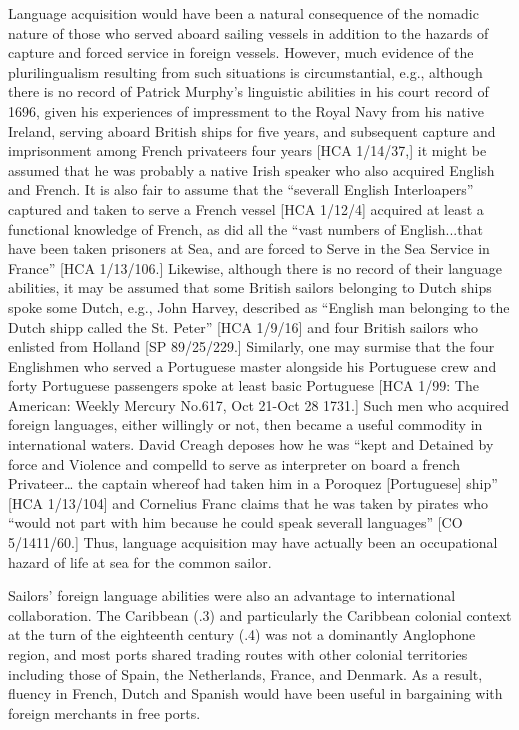 Language acquisition would have been a natural consequence of the nomadic nature of those who served aboard sailing vessels in addition to the hazards of capture and forced service in foreign vessels. However, much evidence of the plurilingualism resulting from such situations is circumstantial, e.g., although there is no record of Patrick Murphy’s linguistic abilities in his court record of 1696, given his experiences of impressment to the Royal Navy from his native Ireland, serving aboard British ships for five years, and subsequent capture and imprisonment among French privateers four years [HCA 1/14/37,] it might be assumed that he was probably a native Irish speaker who also acquired English and French. It is also fair to assume that the “severall English Interloapers” captured and taken to serve a French vessel [HCA 1/12/4] acquired at least a functional knowledge of French, as did all the “vast numbers of English...that have been taken prisoners at Sea, and are forced to Serve in the Sea Service in France” [HCA 1/13/106.]  Likewise, although there is no record of their language abilities, it may be assumed that some British sailors belonging to Dutch ships spoke some Dutch, e.g., John Harvey, described as “English man belonging to the Dutch shipp called the St. Peter” [HCA 1/9/16] and four British sailors who enlisted from Holland [SP 89/25/229.] Similarly, one may surmise that the four Englishmen who served a Portuguese master alongside his Portuguese crew and forty Portuguese passengers spoke at least basic Portuguese [HCA 1/99: The American: Weekly Mercury No.617, Oct 21-Oct 28 1731.] Such men who acquired foreign languages, either willingly or not, then became a useful commodity in international waters. David Creagh deposes how he was “kept and Detained by force and Violence and compelld to serve as interpreter on board a french Privateer… the captain whereof had taken him in a Poroquez [Portuguese] ship” [HCA 1/13/104] and Cornelius Franc claims that he was taken by pirates who “would not part with him because he could speak severall languages” [CO 5/1411/60.] Thus, language acquisition may have actually been an occupational hazard of life at sea for the common sailor. 

Sailors’ foreign language abilities were also an advantage to international collaboration. The Caribbean (.3) and particularly the Caribbean colonial context at the turn of the eighteenth century (.4) was not a dominantly Anglophone region, and most ports shared trading routes with other colonial territories including those of Spain, the Netherlands, France, and Denmark. As a result, fluency in French, Dutch and Spanish would have been useful in bargaining with foreign merchants in free ports.

